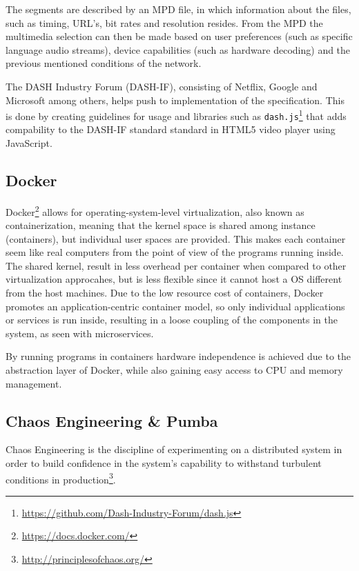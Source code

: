 The segments are described by an \ac{MPD} file, in which information about the files, such as timing, \acs{URL}'s, bit rates and resolution resides. From the \acs{MPD} the multimedia selection can then be made based on user preferences (such as specific language audio streams), device capabilities (such as hardware decoding) and the previous mentioned conditions of the network.

The DASH Industry Forum (DASH-IF), consisting of Netflix, Google and Microsoft among others, helps push to implementation of the specification\cite{ISO23009}. This is done by creating guidelines for usage and libraries such as \texttt{dash.js}\footnote{\url{https://github.com/Dash-Industry-Forum/dash.js}} that adds compability to the DASH-IF standard \cite[Section 6.3]{dash264} standard in HTML5 video player using JavaScript.

\subsection{Docker}
Docker\footnote{\url{https://docs.docker.com/}} allows for operating-system-level virtualization, also known as containerization, meaning that the kernel space is shared among instance (containers), but individual user spaces are provided. This makes each container seem like real computers from the point of view of the programs running inside. 
The shared kernel, result in less overhead per container when compared to other virtualization approcahes, but is less flexible since it cannot host a \acs{OS} different from the host machines. Due to the low resource cost of containers, Docker promotes an application-centric container model\cite{merkel2014docker}, so only individual applications or services is run inside, resulting in a loose coupling of the components in the system, as seen with microservices. 

By running programs in containers hardware independence is achieved due to the abstraction layer of Docker, while also gaining easy access to CPU and memory management.


\subsection{Chaos Engineering \& Pumba}
Chaos Engineering is the discipline of experimenting on a distributed system in order to build confidence in the system’s capability to withstand turbulent conditions in production\footnote{\url{http://principlesofchaos.org/}}.

